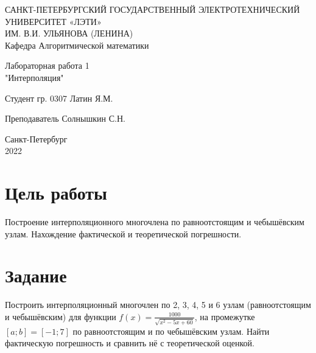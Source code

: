 \documentclass{article}
\begin{document}
	
	\begin{titlepage}
		
		\begin{center}
			САНКТ-ПЕТЕРБУРГСКИЙ ГОСУДАРСТВЕННЫЙ ЭЛЕКТРОТЕХНИЧЕСКИЙ УНИВЕРСИТЕТ «ЛЭТИ» \\ИМ. В.И. УЛЬЯНОВА (ЛЕНИНА)\\
			\vspace{0.1cm}
			Кафедра Алгоритмической математики\\
			
			
			
		\end{center}
		
		\vspace{5cm}
		\begin{center}
			\begin{large}
				Лабораторная работа 1 \\
				"Интерполяция"
			\end{large}
		\end{center}
		
		\vspace{5cm}
		
		\hspace{5cm} Студент гр.  0307 \hrulefill Латин Я.М.
		
		\vspace{0.5cm}
		\hspace{5cm} Преподаватель \hrulefill  Солнышкин С.Н.\\
		
		
		\vfill
		\begin{center}
			Санкт-Петербург\\
			2022
		\end{center}
		
		
	\end{titlepage}
	
	
	\newpage
	\tableofcontents
	\newpage
	
	\section{Цель работы}
	Построение интерполяционного многочлена по равноотстоящим и чебышёвским узлам. Нахождение  фактической и теоретической погрешности.
	\section{Задание}
	Построить интерполяционный многочлен по 2, 3, 4, 5 и 6 узлам (равноотстоящим и чебышёвским) для функции $f(x)=\frac{1000}{\sqrt{x^2-5x+60}}$, на промежутке $[a; b] = [-1; 7]$ по равноотстоящим и по чебышёвским узлам. Найти фактическую погрешность и сравнить нё с теоретической оценкой.
	  
\end{document}
